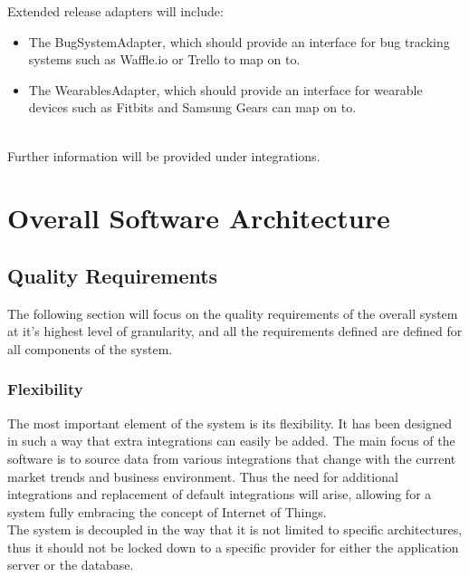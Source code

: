 \documentclass[11pt,a4paper]{article}
\begin{document}
Extended release adapters will include:
\begin{itemize}
	\item The BugSystemAdapter, which should provide an interface for bug tracking systems such as Waffle.io or Trello to map on to.
	\item The WearablesAdapter, which should provide an interface for wearable devices such as Fitbits and Samsung Gears can map on to.\\\\ 
\end{itemize}

Further information will be provided under integrations.

\pagebreak

\section{Overall Software Architecture}

\subsection{Quality Requirements}
The following section will focus on the quality requirements of the overall system at it's highest level of granularity, and all the requirements defined are defined for all components of the system.

\subsubsection{Flexibility}
The most important element of the system is its flexibility. It has been designed in such a way that extra integrations can easily be added. The main focus of the software is to source data from various integrations that change with the current market trends and business environment. Thus the need for additional integrations and replacement of default integrations will arise, allowing for a system fully embracing the concept of Internet of Things.\\
The system is decoupled in the way that it is not limited to specific architectures, thus it should not be locked down to a specific provider for either the application server or the database.
\end{document}
